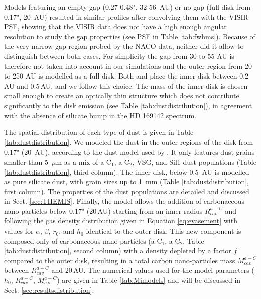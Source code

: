 \documentclass{aa}
\newcommand{\mic}{~$\mu$m\xspace}
\begin{document}
Models featuring an empty gap (0.27-0.48", 32-56~AU) or no gap (full disk from 0.17", 20~AU) resulted in similar profiles after convolving them with the VISIR PSF, showing that the VISIR data does not have a high enough angular resolution to study the gap properties (see PSF in Table \ref{tab:fwhms}). Because of the very narrow gap region probed by the NACO data, neither did it allow to distinguish between both cases. For simplicity the gap from 30 to 55 AU is therefore not taken into account in our simulations and the outer region from 20 to 250 AU is modelled as a full disk. Both \citet{Osorio_2014} and \citet{Monnier_2017} place the inner disk between 0.2\,AU and 0.5\,AU, and we follow this choice. The mass of the inner disk is chosen small enough to create an optically thin structure which does not contribute significantly to the disk emission (see Table \ref{tab:dustdistribution}), in agreement with the absence of silicate bump in the HD 169142 spectrum.

The spatial distribution of each type of dust is given in Table \ref{tab:dustdistribution}. We modeled the dust in the outer regions of the disk from 0.17" (20~AU), according to the dust model used by \citet{Habart2021}. It only features dust grains smaller than 5\mic as a mix of a-C$_1$, a-C$_2$, VSG, and Sil1 dust populations (Table \ref{tab:dustdistribution}, third column). The inner disk, below 0.5~AU is modelled as pure silicate dust, with grain sizes up to 1~mm (Table \ref{tab:dustdistribution}, first column). The properties of the dust populations are detailed and discussed in Sect. \ref{sec:THEMIS}. Finally, the model allows the addition of carbonaceous nano-particles below 0.17" (20\,AU) starting from an inner radius $R_{cav}^{a-C}$ and following the gas density distribution given in Equation \ref{eq:evasement} with values for $\alpha$, $\beta$, $r_0$, and $h_0$ identical to the outer disk. This new component is composed only of carbonaceous nano-particles (a-C$_1$, a-C$_2$, Table \ref{tab:dustdistribution}, second column) with a density depleted by a factor $f$ compared to the outer disk, resulting in a total carbon nano-particles mass $M_{cav}^{a-C}$ between $R_{cav}^{a-C}$ and 20\,AU. The numerical values used for the model parameters ($h_0$, $R_{cav}^{a-C}$, $M_{cav}^{a-C}$) are given in Table \ref{tab:Mimodels} and will be discussed in Sect. \ref{sec:resultsdistribution}.
\end{document}
